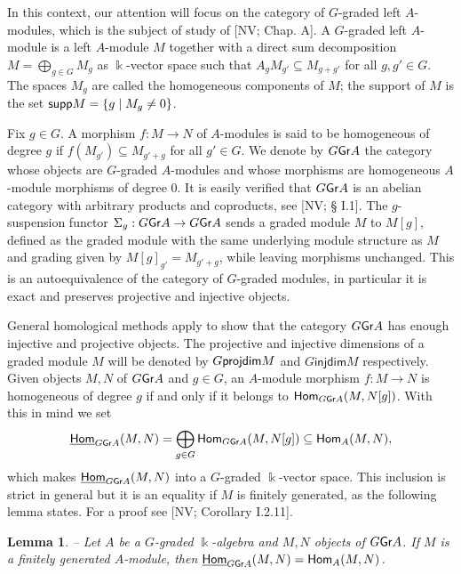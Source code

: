 \documentclass[twoside,11pt]{article}
\renewcommand{\k}{\Bbbk}
\newcommand{\GrMod}{{\sf Gr}}
\newcommand{\Hom}{{\sf Hom}}
\newcommand{\HOM}{\underline{{\sf Hom}}}
\newcommand{\supp}{{\sf supp}}
\newcommand{\pd}{{\sf projdim}}
\newcommand{\injdim}{\mathsf{injdim}}
\newtheorem{sublemma}[subtheorem]{Lemma}
\begin{document}
In this context, our attention will focus on the category of $G$-graded left $A$-modules,
which is the subject of study of [NV; Chap. A]. A $G$-graded left $A$-module is a left
$A$-module $M$ together with a direct sum decomposition $M = \bigoplus_{g\in G} M_g$ as
$\k$-vector space such that $A_g M_{g'} \subseteq M_{g+g'}$ for all $g, g' \in G$. The
spaces $M_g$ are called the homogeneous components of $M$; the support of $M$ is the set
$\supp M = \{g \mid M_g \neq 0\}$.

Fix $g\in G$. A morphism $f : M \longrightarrow N$ of $A$-modules is said to be
homogeneous of degree $g$ if $f(M_{g'}) \subseteq M_{g'+g}$ for all $g' \in G$. 
We denote by $G\GrMod A$ the category whose objects are $G$-graded $A$-modules and whose
morphisms are homogeneous $A$-module morphisms of degree $0$. It is easily verified that
$G\GrMod A$ is an abelian category with arbitrary products and coproducts, see [NV; \S
I.1]. The $g$-suspension functor $\Sigma_g: G\GrMod A \to G\GrMod A$ sends a graded module
$M$ to $M[g]$, defined as the graded module with the same underlying module structure as
$M$ and grading given by $M[g]_{g'} = M_{g'+g}$, while leaving morphisms unchanged. This
is an autoequivalence of the category of $G$-graded modules, in particular it is exact and
preserves projective and injective objects.


General homological methods apply to show that the category $G\GrMod A$ has enough
injective and projective objects. The projective and injective dimensions of a graded
module $M$ will be denoted by $G\pd M$ and $G\injdim M$ respectively.\\

Given objects $M, N$ of $G\GrMod A$ and $g\in G$, an $A$-module morphism $f: M
\longrightarrow N$ is homogeneous of degree $g$ if and only if it belongs to
$\Hom_{G\GrMod A}(M,N[g])$. With this in mind we set
\[
\HOM_{G\GrMod A}(M,N) = \bigoplus_{g\in G} \Hom_{G\GrMod A}(M,N[g]) \subseteq \Hom_A(M,N),
\]
which makes $\HOM_{G\GrMod A}(M,N)$ into a $G$-graded $\k$-vector space. This
inclusion is strict in general but it is an equality if $M$ is finitely generated, as the
following lemma states. For a proof see [NV; Corollary I.2.11].

\begin{sublemma} \label{HOM-Hom} -- 
Let $A$ be a $G$-graded $\k$-algebra and $M,N$ objects of $G\GrMod A$. If $M$ is a
finitely generated $A$-module, then $\HOM_{G\GrMod A}(M,N) = \Hom_A(M,N)$.
\end{sublemma}
\end{document}
